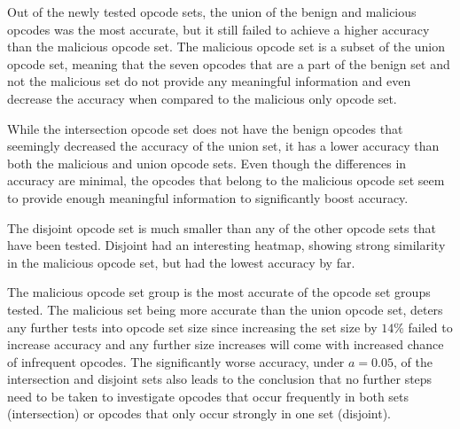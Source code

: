 Out of the newly tested opcode sets, the union of the benign and malicious opcodes was the most accurate, but it still
failed to achieve a higher accuracy than the malicious opcode set.
The malicious opcode set is a subset of the union opcode set, meaning that the seven opcodes that are a part of
the benign set and not the malicious set do not provide any meaningful information and even decrease the accuracy when
compared to the malicious only opcode set.

While the intersection opcode set does not have the benign opcodes that seemingly decreased the accuracy of the
union set, it has a lower accuracy than both the malicious and union opcode sets.
Even though the differences in accuracy are minimal, the opcodes that belong to the malicious opcode
set seem to provide enough meaningful information to significantly boost accuracy.

The disjoint opcode set is much smaller than any of the other opcode sets that have been tested.
Disjoint had an interesting heatmap, showing strong similarity in the malicious opcode set, but had the lowest
accuracy by far.

The malicious opcode set group is the most accurate of the opcode set groups tested.
The malicious set being more accurate than the union opcode set, deters any further tests into opcode set size since
increasing the set size by $14\%$ failed to increase accuracy and any further size increases
will come with increased chance of infrequent opcodes.
The significantly worse accuracy, under $a=0.05$, of the intersection and disjoint sets also leads to the conclusion that
no further steps need to be taken to investigate opcodes that occur frequently in both sets (intersection) or
opcodes that only occur strongly in one set (disjoint).

